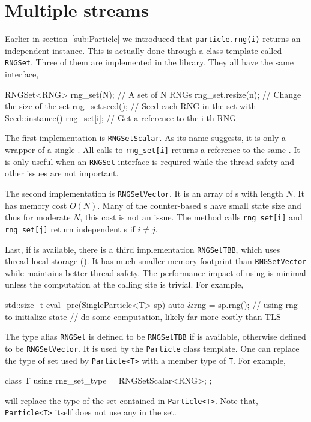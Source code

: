 \section{Multiple \protect\rng streams}
\label{sec:Multiple RNG streams}

Earlier in section~\ref{sub:Particle} we introduced that \verb|particle.rng(i)|
returns an independent \rng instance. This is actually done through a class
template called \verb|RNGSet|. Three of them are implemented in the library.
They all have the same interface,
\begin{cppcode}
  RNGSet<RNG> rng_set(N); // A set of N RNGs
  rng_set.resize(n);      // Change the size of the set
  rng_set.seed();         // Seed each RNG in the set with Seed::instance()
  rng_set[i];             // Get a reference to the i-th RNG
\end{cppcode}
The first implementation is \verb|RNGSetScalar|. As its name suggests, it is
only a wrapper of a single \rng. All calls to \verb|rng_set[i]| returns a
reference to the same \rng. It is only useful when an \verb|RNGSet| interface
is required while the thread-safety and other issues are not important.

The second implementation is \verb|RNGSetVector|. It is an array of \rng{}s
with length $N$. It has memory cost $O(N)$. Many of the counter-based \rng{}s
have small state size and thus for moderate $N$, this cost is not an issue. The
method calls \verb|rng_set[i]| and \verb|rng_set[j]| return independent \rng{}s
if $i \ne j$.

Last, if \tbb is available, there is a third implementation \verb|RNGSetTBB|,
which uses thread-local storage (\tls). It has much smaller memory footprint
than \verb|RNGSetVector| while maintains better thread-safety. The performance
impact of using \tls is minimal unless the computation at the calling site is
trivial. For example,
\begin{cppcode}
  std::size_t eval_pre(SingleParticle<T> sp)
  {
      auto &rng = sp.rng();
      // using rng to initialize state
      // do some computation, likely far more costly than TLS
  }
\end{cppcode}
The type alias \verb|RNGSet| is defined to be \verb|RNGSetTBB| if \tbb is
available, otherwise defined to be \verb|RNGSetVector|. It is used by the
\verb|Particle| class template. One can replace the type of \rng set used by
\verb|Particle<T>| with a member type of \verb|T|. For example,
\begin{cppcode}
  class T
  {
      using rng_set_type = RNGSetScalar<RNG>;
  };
\end{cppcode}
will replace the type of the \rng set contained in \verb|Particle<T>|.  Note
that, \verb|Particle<T>| itself does not use any \rng in the set.

